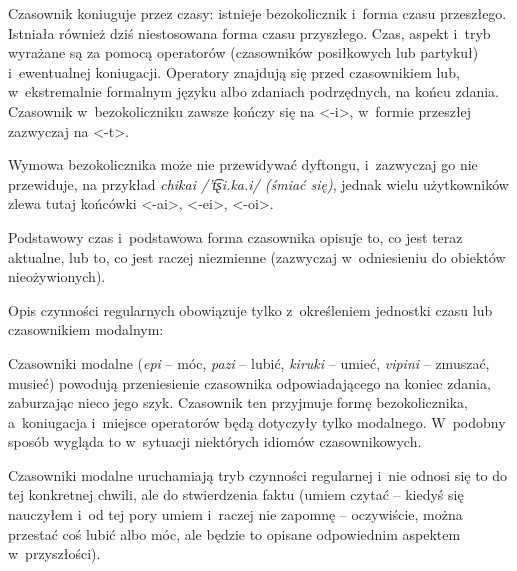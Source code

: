 \begin{spacing}{1.1}
Czasownik koniuguje przez czasy: istnieje bezokolicznik i~forma czasu
przeszłego. Istniała również dziś niestosowana forma czasu przyszłego. Czas,
aspekt i~tryb wyrażane są za pomocą operatorów (czasowników posiłkowych lub
partykuł) i~ewentualnej koniugacji. Operatory znajdują się przed czasownikiem
lub, w~ekstremalnie formalnym języku albo zdaniach podrzędnych, na końcu zdania.
Czasownik w~bezokoliczniku zawsze kończy się na <-i>, w~formie przeszłej
zazwyczaj na <-t>.

Wymowa bezokolicznika może nie przewidywać dyftongu, i~zazwyczaj go nie
przewiduje, na przykład \emph{chikai /'t͡ʂi.ka.i/ (śmiać się)}, jednak wielu
użytkowników zlewa tutaj końcówki <-ai>, <-ei>, <-oi>.

\skipline

Podstawowy czas i~podstawowa forma czasownika opisuje to, co jest teraz
aktualne, lub to, co jest raczej niezmienne (zazwyczaj w~odniesieniu do obiektów
nieożywionych).


Opis czynności regularnych obowiązuje tylko z~określeniem jednostki czasu lub
czasownikiem modalnym:




Czasowniki modalne (\emph{epi} -- móc, \emph{pazi} -- lubić, \emph{kiruki} --
umieć, \emph{vipini} -- zmuszać, musieć) powodują przeniesienie czasownika
odpowiadającego na koniec zdania, zaburzając nieco jego szyk. Czasownik ten
przyjmuje formę bezokolicznika, a~koniugacja i~miejsce operatorów będą dotyczyły
tylko modalnego. W~podobny sposób wygląda to w~sytuacji niektórych idiomów
czasownikowych.



Czasowniki modalne uruchamiają tryb czynności regularnej i~nie odnosi się to do
tej konkretnej chwili, ale do stwierdzenia faktu (umiem czytać -- kiedyś się
nauczyłem i~od tej pory umiem i~raczej nie zapomnę -- oczywiście, można przestać
coś lubić albo móc, ale będzie to opisane odpowiednim aspektem w~przyszłości).


\end{spacing}
